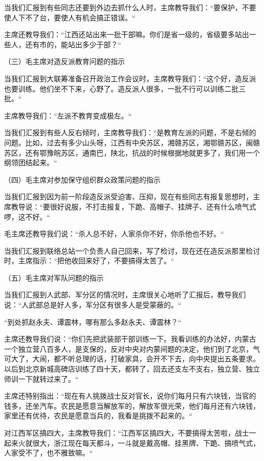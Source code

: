 {当我们汇报到有些同志还要到外边去抓什么人时，主席教导我们：“要保护，不要使人下不了台，要使人有机会搞正错误。“

主席还教导我们：“江西还站出来一批干部嘛。你们是省一级的，省级要多站出一些人，还有市的，能站出多少于部？“

（三）毛主席对造反派教育问题的指示

当我们汇报到大联筹准备召开政治工作会议时，主席教导我们：“这个好，造反派也要训练。他们坐不下来，心野了。造反派人很多，一批不行可以训练二批三批。“

主席教导我们：“左派不教育变成极左。“

当我们汇报到有些人反右倾时，主席教导我们：“是教育左派的问题，不是右倾的问题。比如，过去有多少山头呀，江西有中央苏区，湘赣苏区，湘鄂赣苏区，闽赣苏区，还有鄂豫皖苏区，通南巴，陕北，抗战的时候根据地就更多了，我们用一个纲领团结起来。“

（四）毛主席对参加保守组织群众政策问题的指示

当我们汇报到因为前一阶段造反派受迫害、压抑，现在有些同志有报复思想时，主席教导说：“要很好说服，不打击报复，下跪、高帽子、挂牌子、还有什么喷气式啰，这不好。“

毛主席还教导我们说：“杀人总不好，人家杀你不好，你杀他也不好。“

当我们汇报到联络总站一个负责人自己回来，写了检讨，现在还在造反派那里检讨时，主席指示：“把他收回来好了，不要搞得太苦了。“

（五）毛主席对军队问题的指示

当我们汇报到人武部、军分区的情况时，主席很关心地听了汇报后，教导我们说：“人武部总是好人多，军分区有很多人是受蒙蔽的。“

“到处抓赵永夫、谭震林，哪有那么多赵永夫、谭震林？“

主席还教导我们说：“你们先把武装部干部训练一下。我看训练的办法好，内蒙古一个独立营八百多人，是支保的，反对中央对内蒙间题的决定，他们到了北京，气可大了，大闹，都不听总理的话，打破家具，会开不下去，向中央提出五条要求。以后到北京新城高碑店训练了四十天，都转了，回去还支左不支右，独立营、独立师训一下就转过来了。“

主席还特别指出：“现在有人挑拨战士反对官长，说你们每月只有六块钱，当官的钱多，还坐汽车。农民是愿意当解放军的，解放军很光荣，他们每月还有六块钱，家里还有优待，农民是愿意当兵的，我看是挑拨不起来的。“

对江西军区搞四大，主席教导我们：“江西军区搞四大，不要搞得太苦啦，战士一起来火就很大，浙江现在每天都斗，一斗就是戴高帽、挂黑牌、下跪、搞喷气式，人家受不了，也不雅致嘛。“

}
